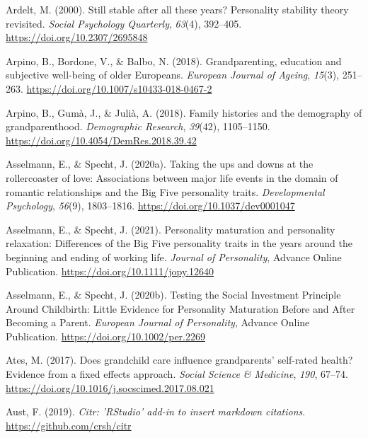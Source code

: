 \documentclass[
  english,
  man,floatsintext]{apa7}
\begin{document}
\leavevmode\hypertarget{ref-ardeltStillStableAll2000}{}%
Ardelt, M. (2000). Still stable after all these years? Personality stability theory revisited. \emph{Social Psychology Quarterly}, \emph{63}(4), 392--405. \url{https://doi.org/10.2307/2695848}

\leavevmode\hypertarget{ref-arpinoGrandparentingEducationSubjective2018}{}%
Arpino, B., Bordone, V., \& Balbo, N. (2018). Grandparenting, education and subjective well-being of older Europeans. \emph{European Journal of Ageing}, \emph{15}(3), 251--263. \url{https://doi.org/10.1007/s10433-018-0467-2}

\leavevmode\hypertarget{ref-arpinoFamilyHistoriesDemography2018}{}%
Arpino, B., Gumà, J., \& Julià, A. (2018). Family histories and the demography of grandparenthood. \emph{Demographic Research}, \emph{39}(42), 1105--1150. \url{https://doi.org/10.4054/DemRes.2018.39.42}

\leavevmode\hypertarget{ref-asselmannTakingUpsDowns2020}{}%
Asselmann, E., \& Specht, J. (2020a). Taking the ups and downs at the rollercoaster of love: Associations between major life events in the domain of romantic relationships and the Big Five personality traits. \emph{Developmental Psychology}, \emph{56}(9), 1803--1816. \url{https://doi.org/10.1037/dev0001047}

\leavevmode\hypertarget{ref-asselmannPersonalityMaturationPersonality2021}{}%
Asselmann, E., \& Specht, J. (2021). Personality maturation and personality relaxation: Differences of the Big Five personality traits in the years around the beginning and ending of working life. \emph{Journal of Personality}, Advance Online Publication. \url{https://doi.org/10.1111/jopy.12640}

\leavevmode\hypertarget{ref-asselmannTestingSocialInvestment2020}{}%
Asselmann, E., \& Specht, J. (2020b). Testing the Social Investment Principle Around Childbirth: Little Evidence for Personality Maturation Before and After Becoming a Parent. \emph{European Journal of Personality}, Advance Online Publication. \url{https://doi.org/10.1002/per.2269}

\leavevmode\hypertarget{ref-atesDoesGrandchildCare2017}{}%
Ates, M. (2017). Does grandchild care influence grandparents' self-rated health? Evidence from a fixed effects approach. \emph{Social Science \& Medicine}, \emph{190}, 67--74. \url{https://doi.org/10.1016/j.socscimed.2017.08.021}

\leavevmode\hypertarget{ref-R-citr}{}%
Aust, F. (2019). \emph{Citr: 'RStudio' add-in to insert markdown citations}. \url{https://github.com/crsh/citr}
\end{document}
